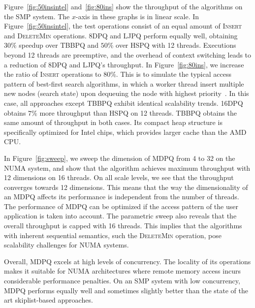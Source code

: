 \documentclass[10pt,journal,letterpaper,compsoc]{IEEEtran}
\begin{document}
Figure~\ref{fig:50insintel} and~\ref{fig:80ins} show the throughput of the algorithms on the SMP system.
The $x$-axis in these graphs is in linear scale.
In Figure~\ref{fig:50insintel}, the test operations consist of an equal amount of \textsc{Insert} and \textsc{DeleteMin} operations.
8DPQ and LJPQ perform equally well, obtaining $30\%$ speedup over TBBPQ and $50\%$ over HSPQ with 12 threads.
Executions beyond 12 threads are preemptive, and the overhead of context switching leads to a reduction of 8DPQ and LJPQ's throughput.
In Figure~\ref{fig:80ins}, we increase the ratio of \textsc{Insert} operations to $80\%$.
This is to simulate the typical access pattern of best-first search algorithms, in which a worker thread insert multiple new nodes (search state) upon dequeuing the node with highest priority~\cite{burns2010best}.
In this case, all approaches except TBBPQ exhibit identical scalability trends.
16DPQ obtains $7\%$ more throughput than HSPQ on 12 threads.
TBBPQ obtains the same amount of throughput in both cases.
Its compact heap structure is specifically optimized for Intel chips, which provides larger cache than the AMD CPU.

In Figure~\ref{fig:sweep}, we sweep the dimension of MDPQ from 4 to 32 on the NUMA system, and show that the algorithm achieves maximum throughput with 12 dimensions on 16 threads. 
On all scale levels, we see that the throughput converges towards 12 dimensions.
This means that the way the dimensionality of an MDPQ affects its performance is independent from the number of threads.
The performance of MDPQ can be optimized if the access pattern of the user application is taken into account.
The parametric sweep also reveals that the overall throughput is capped with 16 threads.
This implies that the algorithms with inherent sequential semantics, such the \textsc{DeleteMin} operation, pose scalability challenges for NUMA systems.

Overall, MDPQ excels at high levels of concurrency.
The locality of its operations makes it suitable for NUMA architectures where remote memory access incurs considerable performance penalties.
On an SMP system with low concurrency, MDPQ performs equally well and sometimes slightly better than the state of the art skiplist-based approaches.
\end{document}
